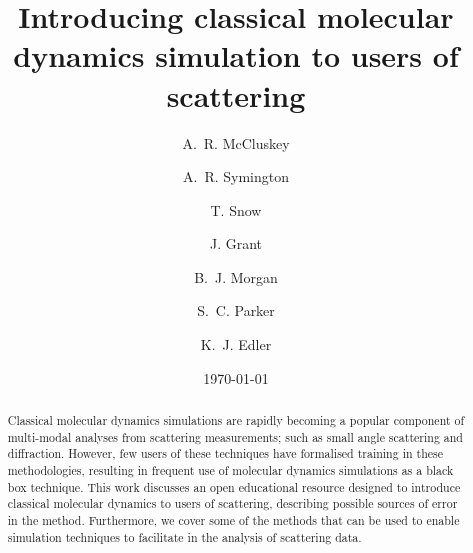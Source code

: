 \documentclass[amsmath,amssymb,twocolumn,superscriptaddress]{revtex4-1}
\begin{document}

\title{Introducing classical molecular dynamics simulation to users of
scattering}

\author{A.~R. McCluskey}

\author{A.~R. Symington}

\author{T. Snow}

\author{J. Grant}

\author{B.~J. Morgan}

\author{S.~C. Parker}

\author{K.~J. Edler}

\date{\today}

\begin{abstract}
\noindent Classical molecular dynamics simulations are rapidly becoming a popular component of multi-modal analyses from scattering measurements; such as small angle scattering and diffraction.
However, few users of these techniques have formalised training in these methodologies, resulting in frequent use of molecular dynamics simulations as a black box technique.
This work discusses an open educational resource designed to introduce classical molecular dynamics to users of scattering, describing possible sources of error in the method.
Furthermore, we cover some of the methods that can be used to enable simulation techniques to facilitate in the analysis of scattering data.
\end{abstract}

\maketitle                        %
\end{document}

